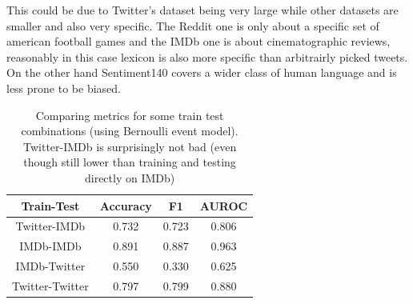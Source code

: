 This could be due to Twitter's dataset being very large while other datasets are smaller and also very specific.
The Reddit one is only about a specific set of american football games and the IMDb one is about cinematographic reviews, reasonably in this case lexicon is also more specific than arbitrairly picked tweets.
On the other hand Sentiment140 covers a wider class of human language and is less prone to be biased.


\begin{table}[h!t]
    \centering
    \caption{Comparing metrics for some train test combinations (using Bernoulli event model). Twitter-IMDb is surprisingly not bad (even though still lower than training and testing directly on IMDb)}
    \label{tab:versus_metrics}
    \begin{tabular}{c|ccc}
        \hline
        Train-Test & Accuracy & F1 & AUROC \\
        \hline 
        Twitter-IMDb & 0.732 & 0.723 & 0.806 \\ 
        IMDb-IMDb & 0.891 & 0.887 & 0.963 \\ 
        IMDb-Twitter & 0.550 & 0.330 & 0.625 \\ 
        Twitter-Twitter & 0.797 & 0.799 & 0.880 \\ 
        \hline
    \end{tabular}
\end{table}
